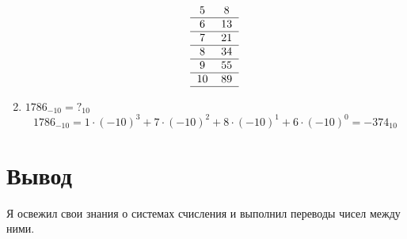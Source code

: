 \documentclass{article}
\begin{document}
\begin{enumerate}
$$\begin{tabular}{cc}
            5  & 8      \\
            \hline
            6  & 13     \\
            \hline
            7  & 21     \\
            \hline
            8  & 34     \\
            \hline
            9  & 55     \\
            \hline
            10 & 89     \\
            \hline
          \end{tabular} $$
  \item $ 1786_{-10} = ?_{10}$
        $$  1786_{-10} = 1\cdot(-10)^3 + 7\cdot(-10)^2 + 8\cdot(-10)^1 + 6\cdot(-10)^0 =
          -374_{10}
        $$

\end{enumerate}

\section*{Вывод}
Я освежил свои знания о системах счисления и выполнил переводы чисел между ними.
\end{document}
